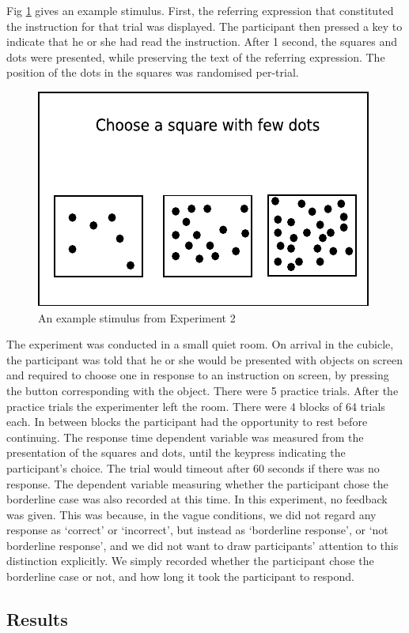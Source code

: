 \documentclass[graybox,envcountchap,sectrefs%
,footinfo
]{svmono}
\begin{document}
Fig \ref{stimuluse2} gives an example stimulus. First, the referring expression that constituted the instruction for that trial was displayed. The participant then pressed a key to indicate that he or she had read the instruction. After 1 second,  the squares and dots were presented, while preserving the text of the referring expression. The position of the dots in the squares was randomised per-trial.

\begin{figure}[tbp]
\centering
\includegraphics[width=.4\textwidth]{images/stimuluse2}
\caption{An example stimulus from Experiment 2}
\label{stimuluse2}
\end{figure}

The experiment was conducted in a small quiet room.
On arrival in the cubicle, the participant was told that he or she would be presented with objects on screen and required to choose one in response to an instruction on screen, by pressing the button corresponding with the object. There were 5 practice trials. After the practice trials the experimenter left the room. There were 4 blocks of 64 trials each. In between blocks the participant had the opportunity to rest before continuing. The response time dependent variable was measured from the presentation of the squares and dots, until the keypress indicating the participant's choice. The trial would timeout after 60 seconds if there was no response. The dependent variable measuring whether the participant chose the borderline case was also recorded at this time. In this experiment, no feedback was given. This was because, in the vague conditions, we did not regard any response as `correct' or `incorrect', but instead as `borderline response', or `not borderline response', and we did not want to draw participants' attention to this distinction explicitly. We simply recorded whether the participant chose the borderline case or not, and how long it took the participant to respond.

\subsection{Results}
\end{document}
